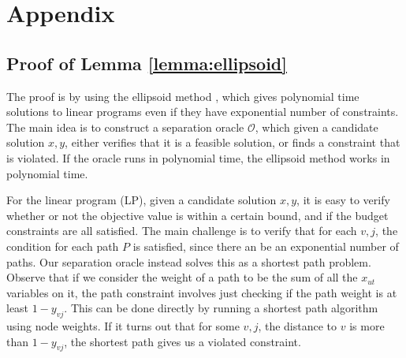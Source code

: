 \section{Appendix}
\label{appendix}

\subsection{Proof of Lemma \ref{lemma:ellipsoid}}

The proof is by using the ellipsoid method \cite{gls:book}, which gives polynomial time solutions to linear programs even if they have exponential number of constraints. The main idea is to construct a separation oracle $\mathcal{O}$, which given a candidate solution $x, y$, either verifies that it is a feasible solution, or finds a constraint that is violated. If the oracle runs in polynomial time, the ellipsoid method works in polynomial time.

For the linear program (LP), given a candidate solution $x, y$, it is easy to verify whether or not the objective value is within a certain bound, and if the budget constraints are all satisfied. The main challenge is to verify that for each $v, j$, the condition for each path $P$ is satisfied, since there an be an exponential number of paths. Our separation oracle instead solves this as a shortest path problem. Observe that if we consider the weight of a path to be the sum of all the $x_{ut}$ variables on it, the path constraint involves just checking if the path weight is at least $1-y_{vj}$. This can be done directly by running a shortest path algorithm using node weights. If it turns out that for some $v,j$, the distance to $v$ is more than $1-y_{vj}$, the shortest path gives us a violated constraint.